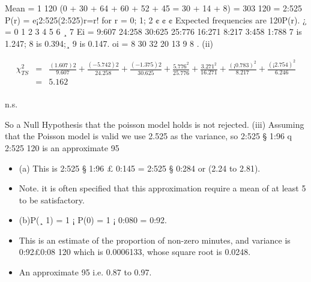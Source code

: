 \documentclass[a4paper,12pt]{article}
\begin{document}
\begin{enumerate}Mean =
1
120
(0 + 30 + 64 + 60 + 52 + 45 = 30 + 14 + 8) =
303
120
= 2:525
P(r) = e¡2:525(2:525)r=r! for r = 0; 1; 2 ¢ ¢ ¢
Expected frequencies are 120P(r).
¿ = 0 1 2 3 4 5 6 ¸ 7
Ei = 9:607 24:258 30:625 25:776 16:271 8:217 3:458 1:788
7 is 1.247; 8 is 0.394;¸ 9 is 0.147.
oi = 8 30 32 20 13 9 8
.
(ii)


\begin{eqnarray*}
\chi^2_{TS}
&=&
\frac{(1.607)2 }{9.607}
+
\frac{(-5.742)2 }{24.258}
+
\frac{(-1.375)2}{30.625}
+
\frac{5.776^2}{25.776}
+
\frac{3.271^2}{16.271}
+
\frac{(¡0.783)^2}{8.217}
+
\frac{(¡2.754)^2}{6.246}\\

&=& 5.162 \\ 
\end{eqnarray*}

n.s.

So a Null Hypothesis that the poisson model holds is not rejected.
(iii) Assuming that the Poisson model is valid we use 2.525 as the variance, so
2:525 § 1:96
q
2:525
120 is an approximate 95%

\begin{itemize}
    \item (a) This is 2:525 § 1:96 £ 0:145 = 2:525 § 0:284 or (2.24 to 2.81).
\item Note. it is often specified that this approximation require a mean of at least 5 to be
satisfactory.
\item (b)P(¸ 1) = 1 ¡ P(0) = 1 ¡ 0:080 = 0:92. 
\item This is an estimate of the proportion
of non-zero minutes, and variance is 0:92£0:08
120 which is 0.0006133, whose square root is
0.0248.
\item An approximate 95%
i.e. 0.87 to 0.97.
\end{itemize}

\end{enumerate}
\end{document}
